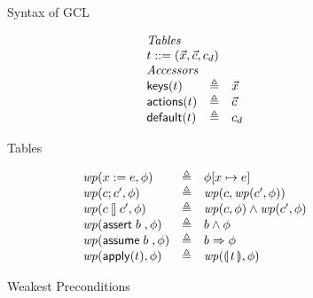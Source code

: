 \begin{figure}[ht]
  \caption{Syntax of GCL}
  \label{fig:syntaxgcl}
  
\end{figure}


\begin{figure}[ht]
  \[\begin{array}{l >{\triangleq}c l}
      \multicolumn 3 l {\textit{Tables}} \\
      \multicolumn 3 l {t::= (\vec x, \vec c, c_d)}\\
      \multicolumn 3 l {\textit{Accessors}}\\
      \keys t && \vec x\\
      \actions t && \vec c \\
      \default t && c_d
    \end{array}\]

  \caption{Tables}
  \label{fig:tables}
\end{figure}

\begin{figure}[ht]
  \[\begin{array}{l >{\triangleq}c l}
      \wp(x:=e, \phi) && \phi[x \mapsto e]\\
      \wp(c;c', \phi) && \wp(c, \wp(c', \phi)) \\
      \wp(c\angel c', \phi) && \wp(c, \phi) \wedge \wp(c',\phi) \\
      \wp(\assert b, \phi) && b \wedge \phi \\
      \wp(\assume b, \phi) && b \Rightarrow \phi \\
      \wp(\apply t, \phi) && \wp(\parenbb t, \phi) \\
    \end{array}\]
  \caption{Weakest Preconditions}
  \label{fig:wp}
\end{figure}

  

